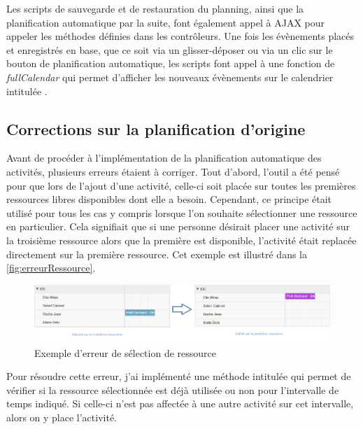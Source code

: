 \documentclass[noposter]{polytech/polytech}
\begin{document}
Les scripts de sauvegarde et de restauration du planning, ainsi que la planification automatique par la suite, font également appel à AJAX pour appeler les méthodes définies dans les contrôleurs. Une fois les évènements placés et enregistrés en base, que ce soit via un glisser-déposer ou via un clic sur le bouton de planification automatique, les scripts font appel à une fonction de \textit{fullCalendar} qui permet d'afficher les nouveaux évènements sur le calendrier intitulée .


\subsection{Corrections sur la planification d'origine}


Avant de procéder à l'implémentation de la planification automatique des activités, plusieurs erreurs étaient à corriger. Tout d'abord, l'outil a été pensé pour que lors de l'ajout d'une activité, celle-ci soit placée sur toutes les premières ressources libres disponibles dont elle a besoin. Cependant, ce principe était utilisé pour tous les cas y compris lorsque l'on souhaite sélectionner une ressource en particulier. Cela signifiait que si une personne désirait placer une activité sur la troisième ressource alors que la première est disponible, l'activité était replacée directement sur la première ressource. Cet exemple est illustré dans la \autoref{fig:erreurRessource}.

\begin{figure}
	\includegraphics[scale=0.5]{images/erreurRessource}
	\caption{Exemple d'erreur de sélection de ressource}
	\label{fig:erreurRessource}
\end{figure}

Pour résoudre cette erreur, j'ai implémenté une méthode intitulée  qui permet de vérifier si la ressource sélectionnée est déjà utilisée ou non pour l'intervalle de temps indiqué. Si celle-ci n'est pas affectée à une autre activité sur cet intervalle, alors on y place l'activité. 
\end{document}
